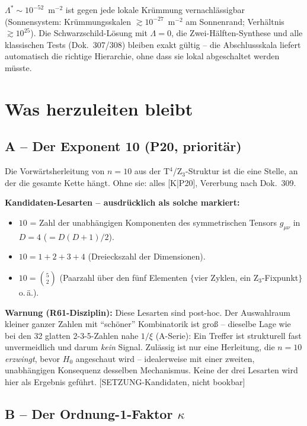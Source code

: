 \documentclass[11pt]{report}
\begin{document}
$\Lambda^{*} \sim 10^{-52}$~m$^{-2}$ ist gegen jede lokale Krümmung
vernachlässigbar (Sonnensystem: Krümmungsskalen
$\gtrsim 10^{-27}$~m$^{-2}$ am Sonnenrand; Verhältnis
$\gtrsim 10^{25}$). Die Schwarzschild-Lösung mit $\Lambda = 0$, die
Zwei-Hälften-Synthese und alle klassischen Tests (Dok.~307/308)
bleiben exakt gültig -- die Abschlussskala liefert automatisch die
richtige Hierarchie, ohne dass sie lokal abgeschaltet werden müsste.

\chapter{Was herzuleiten bleibt}
\label{ch:pflichten}

\section{A -- Der Exponent 10 (P20, prioritär)}

Die Vorwärtsherleitung von $n=10$ aus der T$^4$/Z$_3$-Struktur ist
die eine Stelle, an der die gesamte Kette hängt. Ohne sie: alles
[K|P20], Vererbung nach Dok.~309.

\textbf{Kandidaten-Lesarten -- ausdrücklich als solche markiert:}
\begin{itemize}
  \item $10$ = Zahl der unabhängigen Komponenten des symmetrischen
        Tensors $g_{\mu\nu}$ in $D=4$ ($= D(D{+}1)/2$).
  \item $10 = 1+2+3+4$ (Dreieckszahl der Dimensionen).
  \item $10 = \binom{5}{2}$ (Paarzahl über den fünf Elementen
        $\{$vier Zyklen, ein Z$_3$-Fixpunkt$\}$ o.\,ä.).
\end{itemize}

\textbf{Warnung (R61-Disziplin):} Diese Lesarten sind post-hoc.
Der Auswahlraum kleiner ganzer Zahlen mit \enquote{schöner}
Kombinatorik ist groß -- dieselbe Lage wie bei den 32 glatten
2-3-5-Zahlen nahe $1/\xi$ (A-Serie): Ein Treffer ist strukturell
fast unvermeidlich und darum \emph{kein} Signal. Zulässig ist nur
eine Herleitung, die $n=10$ \emph{erzwingt}, bevor $H_0$ angeschaut
wird -- idealerweise mit einer zweiten, unabhängigen Konsequenz
desselben Mechanismus. Keine der drei Lesarten wird hier als
Ergebnis geführt. [SETZUNG-Kandidaten, nicht bookbar]

\section{B -- Der Ordnung-1-Faktor $\kappa$}
\end{document}
